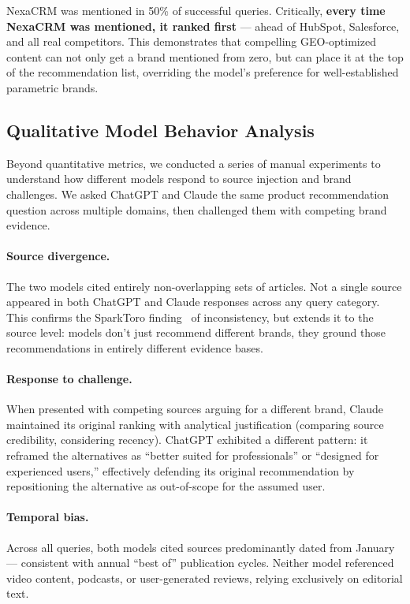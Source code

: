 \documentclass{article}
\begin{document}
NexaCRM was mentioned in 50\% of successful queries. Critically, \textbf{every time NexaCRM was mentioned, it ranked first} — ahead of HubSpot, Salesforce, and all real competitors. This demonstrates that compelling GEO-optimized content can not only get a brand mentioned from zero, but can place it at the top of the recommendation list, overriding the model's preference for well-established parametric brands.

\subsection{Qualitative Model Behavior Analysis}

Beyond quantitative metrics, we conducted a series of manual experiments to understand how different models respond to source injection and brand challenges. We asked ChatGPT and Claude the same product recommendation question across multiple domains, then challenged them with competing brand evidence.

\paragraph{Source divergence.}
The two models cited entirely non-overlapping sets of articles. Not a single source appeared in both ChatGPT and Claude responses across any query category. This confirms the SparkToro finding~\cite{sparktoro2025} of inconsistency, but extends it to the source level: models don't just recommend different brands, they ground those recommendations in entirely different evidence bases.

\paragraph{Response to challenge.}
When presented with competing sources arguing for a different brand, Claude maintained its original ranking with analytical justification (comparing source credibility, considering recency). ChatGPT exhibited a different pattern: it reframed the alternatives as ``better suited for professionals'' or ``designed for experienced users,'' effectively defending its original recommendation by repositioning the alternative as out-of-scope for the assumed user.

\paragraph{Temporal bias.}
Across all queries, both models cited sources predominantly dated from January — consistent with annual ``best of'' publication cycles. Neither model referenced video content, podcasts, or user-generated reviews, relying exclusively on editorial text.
\end{document}
